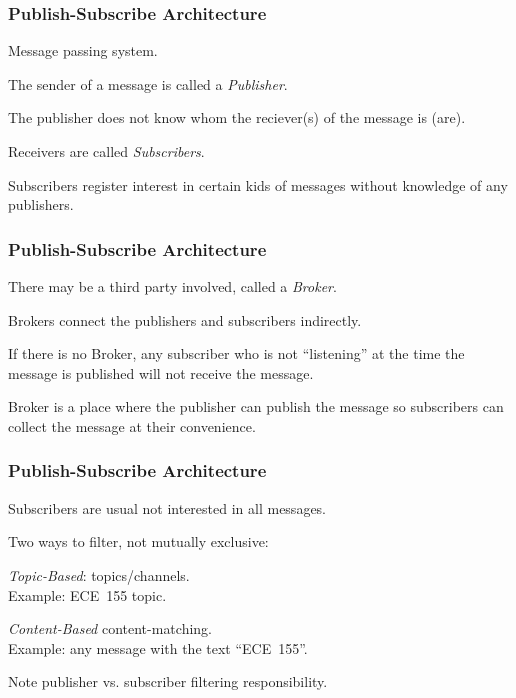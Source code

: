\begin{frame}
\frametitle{Publish-Subscribe Architecture}

\begin{changemargin}{1cm}
Message passing system.

The sender of a message is called a \textit{Publisher}. 

The publisher does not know whom the reciever(s) of the message is (are). 

Receivers are called \textit{Subscribers}. 

Subscribers register interest in certain kids of messages without knowledge of any publishers.

\end{changemargin}
\end{frame}

\begin{frame}
\frametitle{Publish-Subscribe Architecture}

\begin{changemargin}{1cm}

There may be a third party involved, called a \textit{Broker}.

Brokers connect the publishers and subscribers indirectly. 

If there is no Broker, any subscriber who is not ``listening'' at the time the message is published will not receive the message. 

Broker is a place where the publisher can publish the message so subscribers can collect the message at their convenience.


\end{changemargin}
\end{frame}

\begin{frame}
\frametitle{Publish-Subscribe Architecture}

\begin{changemargin}{1cm}

Subscribers are usual not interested in all messages.

Two ways to filter, not mutually exclusive:

\textit{Topic-Based}: topics/channels. \\
\quad Example: ECE~155 topic. 

\textit{Content-Based} content-matching. \\
\quad Example: any message with the text ``ECE~155''.

Note publisher vs. subscriber filtering responsibility.

\end{changemargin}
\end{frame}


